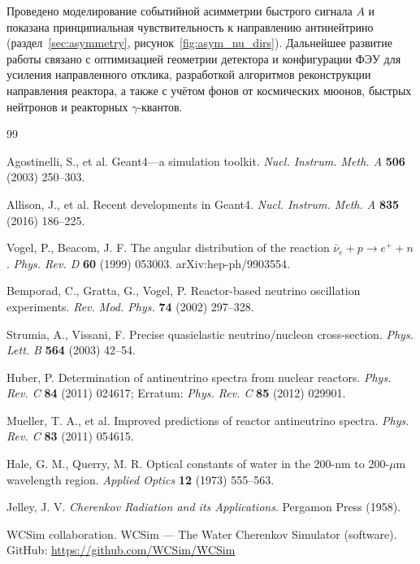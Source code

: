 \documentclass[a4paper,12pt]{extarticle}
\begin{document}
Проведено моделирование событийной асимметрии быстрого сигнала $A$ и показана принципиальная чувствительность к направлению антинейтрино (раздел~\ref{sec:asymmetry}, рисунок~\ref{fig:asym_nu_dirs}). Дальнейшее развитие работы связано с оптимизацией геометрии детектора и конфигурации ФЭУ для усиления направленного отклика, разработкой алгоритмов реконструкции направления реактора, а также с учётом фонов от космических мюонов, быстрых нейтронов и реакторных $\gamma$-квантов.

\newpage
\renewcommand{\refname}{Список использованных источников}
{}
\begin{thebibliography}{99}

 Agostinelli, S., et al. Geant4---a simulation toolkit. \textit{Nucl. Instrum. Meth. A} \textbf{506} (2003) 250--303.

 Allison, J., et al. Recent developments in Geant4. \textit{Nucl. Instrum. Meth. A} \textbf{835} (2016) 186--225.

 Vogel, P., Beacom, J. F. The angular distribution of the reaction $\bar{\nu}_e + p \rightarrow e^+ + n$. \textit{Phys. Rev. D} \textbf{60} (1999) 053003. arXiv:hep-ph/9903554.

 Bemporad, C., Gratta, G., Vogel, P. Reactor-based neutrino oscillation experiments. \textit{Rev. Mod. Phys.} \textbf{74} (2002) 297--328.

 Strumia, A., Vissani, F. Precise quasielastic neutrino/nucleon cross-section. \textit{Phys. Lett. B} \textbf{564} (2003) 42--54.

 Huber, P. Determination of antineutrino spectra from nuclear reactors. \textit{Phys. Rev. C} \textbf{84} (2011) 024617; Erratum: \textit{Phys. Rev. C} \textbf{85} (2012) 029901.

 Mueller, T. A., et al. Improved predictions of reactor antineutrino spectra. \textit{Phys. Rev. C} \textbf{83} (2011) 054615.

 Hale, G. M., Querry, M. R. Optical constants of water in the 200-nm to 200-$\mu$m wavelength region. \textit{Applied Optics} \textbf{12} (1973) 555--563.

 Jelley, J. V. \textit{Cherenkov Radiation and its Applications}. Pergamon Press (1958).

 WCSim collaboration. WCSim --- The Water Cherenkov Simulator (software). GitHub: \url{https://github.com/WCSim/WCSim}


\end{thebibliography}
\end{document}
